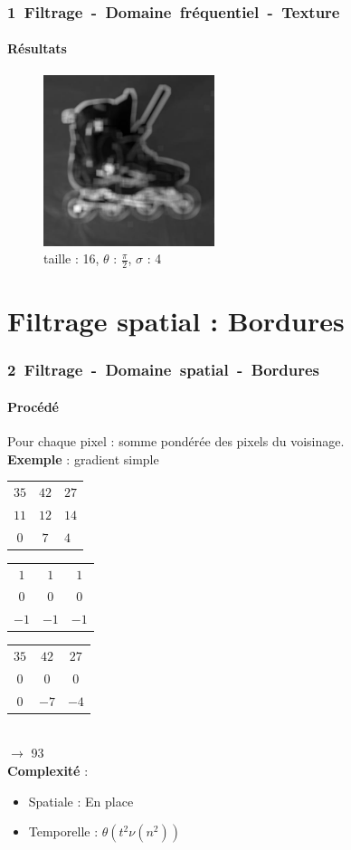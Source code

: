 \documentclass[french]{beamer}
\begin{document}
\begin{frame}
	\frametitle{\mbox{1 Filtrage - Domaine fréquentiel - Texture}}
	\framesubtitle{Résultats}
	\begin{figure}
		\centering
		\includegraphics[width=5cm]{images/roller_resp.jpg}
		\caption{taille : 16, $\theta$ : $\frac{\pi}{2}$, $\sigma$ : 4}
	\end{figure}
\end{frame}

\section{Filtrage spatial : Bordures}

\begin{frame}
	\frametitle{\mbox{2 Filtrage - Domaine spatial - Bordures}}
	\framesubtitle{Procédé}
	Pour chaque pixel : somme pondérée des pixels du voisinage.\\
	\textbf{Exemple} : gradient simple \\
	\medskip
	\begin{tabular}{|ccc|}
		\hline
		$35$ & $42$ & $27$ \\
		$11$ & $12$ & $14$ \\
		$0$ & $7$ & $4$ \\
		\hline
	\end{tabular}
	\begin{tabular}{|ccc|}
		\hline
		$1$ & $1$ & $1$ \\
		$0$ & $0$ & $0$ \\
		$-1$ & $-1$ & $-1$ \\
		\hline
	\end{tabular}
	\begin{tabular}{|ccc|}
		\hline
		$35$ & $42$ & $27$ \\
		$0$ & $0$ & $0$ \\
		$0$ & $-7$ & $-4$ \\
		\hline
	\end{tabular} \\
	\medskip
	$\longrightarrow$ 93 \\
	\bigskip
	\textbf{Complexité} :
	\begin{itemize}
		\item Spatiale : En place
		\item Temporelle : $\theta(t^2\nu(n^2))$
	\end{itemize}
\end{frame}
\end{document}
